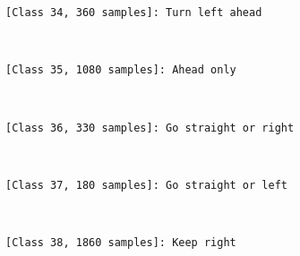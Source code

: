 \documentclass[11pt]{article}
\begin{document}
    \begin{Verbatim}[commandchars=\\\{\}]
[Class 34, 360 samples]: Turn left ahead

    \end{Verbatim}

    \begin{center}
    \end{center}
    { \hspace*{\fill} \\}
    
    \begin{Verbatim}[commandchars=\\\{\}]
[Class 35, 1080 samples]: Ahead only

    \end{Verbatim}

    \begin{center}
    \end{center}
    { \hspace*{\fill} \\}
    
    \begin{Verbatim}[commandchars=\\\{\}]
[Class 36, 330 samples]: Go straight or right

    \end{Verbatim}

    \begin{center}
    \end{center}
    { \hspace*{\fill} \\}
    
    \begin{Verbatim}[commandchars=\\\{\}]
[Class 37, 180 samples]: Go straight or left

    \end{Verbatim}

    \begin{center}
    \end{center}
    { \hspace*{\fill} \\}
    
    \begin{Verbatim}[commandchars=\\\{\}]
[Class 38, 1860 samples]: Keep right

    \end{Verbatim}
\end{document}
